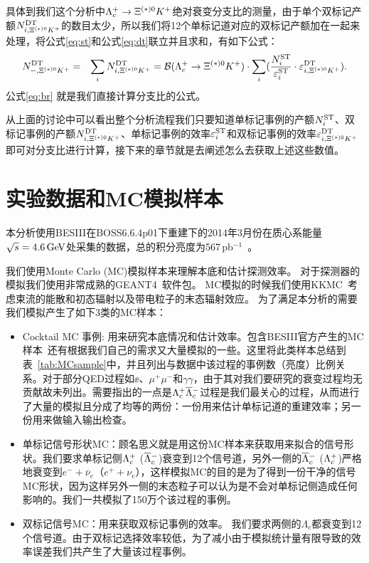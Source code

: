 具体到我们这个分析中$\Lambda_{c}^{+}\rightarrow \Xi^{(*)0}K^{+}$绝对衰变分支比的测量，由于单个双标记产额$N_{i,\Xi^{(*)0}K^{+}}^{\rm DT}$的数目太少，所以我们将12个单标记道对应的双标记产额加在一起来处理，将公式\ref{eq:st}和公式\ref{eq:dt}联立并且求和，有如下公式：
\begin{eqnarray}
N_{-,\Xi^{(*)0}K^{+}}^{\rm DT}&=&\sum_{i}N_{i,\Xi^{(*)0}K^{+}}^{\rm DT}=\mathcal{B}(\Lambda_{c}^{+}\rightarrow \Xi^{(*)0}K^{+})\cdot\sum_{i}(\frac{N_{i}^{\rm ST}}{\varepsilon_{i}^{\rm ST}}\cdot\varepsilon_{i,\Xi^{(*)0}K^{+}}^{\rm DT}).
\label{eq:br}
\end{eqnarray}
公式\ref{eq:br} 就是我们直接计算分支比的公式。

从上面的讨论中可以看出整个分析流程我们只要知道单标记事例的产额$N_{i}^{\rm ST}$、双标记事例的产额$N_{i,\Xi^{(*)0}K^{+}}^{\rm DT}$、单标记事例的效率$\varepsilon_{i}^{\rm ST}$和双标记事例的效率$\varepsilon_{i,\Xi^{(*)0}K^{+}}^{\rm DT}$即可对分支比进行计算，接下来的章节就是去阐述怎么去获取上述这些数值。

\section{实验数据和MC模拟样本}
\label{sec:sample}
本分析使用BESIII在BOSS6.6.4p01下重建下的2014年3月份在质心系能量$\sqrt{s}=4.6\mathrm{\,Ge\kern -0.1em V}$处采集的数据，总的积分亮度为567\,pb$^{-1}$~\cite{Ablikim:2015nan}。 

我们使用Monte Carlo (MC)模拟样本来理解本底和估计探测效率。
对于探测器的模拟我们使用非常成熟的GEANT4~\cite{ref:geant4a,ref:geant4b}软件包。
MC模拟的时候我们使用KKMC~\cite{Jadach:2000ir}考虑束流的能散和初态辐射以及带电粒子的末态辐射效应。
为了满足本分析的需要我们模拟产生了如下3类的MC样本：

\begin{itemize}
    \item Cocktail MC 事例: 用来研究本底情况和估计效率。包含BESIII官方产生的MC样本~\cite{pingrg_mc}还有根据我们自己的需求又大量模拟的一些。这里将此类样本总结到表~\ref{tab:MCsample}中，并且列出与数据中该过程的事例数（亮度）比例关系。对于部分QED过程如$\ee$、$\mu^+\mu^-$和$\gamma\gamma$，由于其对我们要研究的衰变过程均无贡献故未列出。需要指出的一点是$\Lambda_{c}^{+}\overline{\Lambda}{}_{c}^{-}$过程是我们最关心的过程，从而进行了大量的模拟且分成了均等的两份：一份用来估计单标记道的重建效率；另一份用来做输入输出检查。
    \item 单标记信号形状MC：顾名思义就是用这份MC样本来获取用来拟合的信号形状。我们要求单标记侧$\Lambda_{c}^{+}$ ($\overline{\Lambda}{}_{c}^{-}$)衰变到12个信号道，另外一侧的$\overline{\Lambda}{}_{c}^{-}$ ($\Lambda_{c}^{+}$)严格地衰变到$e^{-}+\overline{\nu}_{e}$（$e^{+}+\nu_{e}$），这样模拟MC的目的是为了得到一份干净的信号MC形状，因为这样另外一侧的末态粒子可以认为是不会对单标记侧造成任何影响的。我们一共模拟了150万个该过程的事例。

    \item 双标记信号MC：用来获取双标记事例的效率。 我们要求两侧的$\Lambda_c$都衰变到12个信号道。由于双标记选择效率较低，为了减小由于模拟统计量有限导致的效率误差我们共产生了大量该过程事例。
\end{itemize}

